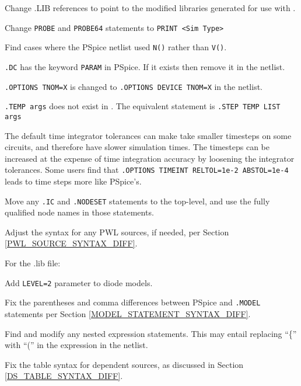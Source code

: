 \begin{XyceItemize}
\item Change .LIB references to point to the modified libraries generated
   for use with \Xyce{}.
\item Change \texttt{PROBE} and \texttt{PROBE64} statements to \texttt{PRINT <Sim Type>}
\item Find cases where the PSpice netlist used \texttt{N()} rather
   than \texttt{V()}.
\item \texttt{.DC} has the keyword \texttt{PARAM} in PSpice.  If it
   exists then remove it in the \Xyce{} netlist.
\item \texttt{.OPTIONS TNOM=X} is changed to \texttt{.OPTIONS
   DEVICE TNOM=X} in the \Xyce{} netlist.
\item \texttt{.TEMP args} does not exist in \Xyce{}.  The equivalent
   \Xyce{} statement is \texttt{.STEP TEMP LIST args}
\item The default time integrator tolerances can make \Xyce{} take
   smaller timesteps on some circuits, and therefore have slower
   simulation times.  The \Xyce{} timesteps can be increased at the
   expense of time integration accuracy by loosening the
   integrator tolerances.  Some users find that  \texttt{.OPTIONS 
   TIMEINT RELTOL=1e-2 ABSTOL=1e-4} leads to time steps more like PSpice's.
\item Move any \texttt{.IC} and \texttt{.NODESET} statements to the top-level,
   and use the fully qualified node names in those statements.
\item Adjust the syntax for any PWL sources, if needed, per 
   Section \ref{PWL_SOURCE_SYNTAX_DIFF}.
\end{XyceItemize}

For the .lib file:
\begin{XyceItemize}
\item Add \texttt{LEVEL=2} parameter to diode models.
\item Fix the parentheses and comma differences between PSpice and 
   \Xyce \texttt{.MODEL} statements per Section \ref{MODEL_STATEMENT_SYNTAX_DIFF}.
\item Find and modify any nested expression statements.  This may 
   entail replacing ``\{'' with ``('' in the expression in the \Xyce{} netlist.
\item Fix the table syntax for dependent sources, as discussed in
Section \ref{DS_TABLE_SYNTAX_DIFF}.

\end{XyceItemize}

